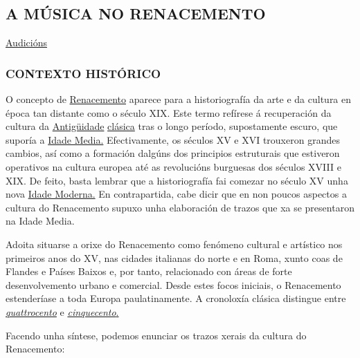 \documentclass[
]{article}
\author{}
\date{}
\begin{document}
\hypertarget{a-muxfasica-no-renacemento}{%
\subsection{A MÚSICA NO RENACEMENTO}\label{a-muxfasica-no-renacemento}}

\href{http://open.spotify.com/user/javierjuradoluque/playlist/6hkvm3DeOXNPNpkdOMWdzc}{Audicións}

\hypertarget{contexto-histuxf3rico}{%
\subsubsection{CONTEXTO HISTÓRICO}\label{contexto-histuxf3rico}}

O concepto de
\href{http://es.wikipedia.org/wiki/Renacimiento}{Renacemento} aparece
para a historiografía da arte e da cultura en época tan distante como o
século XIX. Este termo refírese á recuperación da cultura da
\href{http://es.wikipedia.org/wiki/Antig\%C3\%BCedad_cl\%C3\%A1sica}{Antigüidade}
\href{http://es.wikipedia.org/wiki/Antig\%C3\%BCedad_cl\%C3\%A1sica}{clásica}
tras o longo período, supostamente escuro, que suporía a
\href{http://es.wikipedia.org/wiki/Edad_Media}{Idade Media.}
Efectivamente, os séculos XV e XVI trouxeron grandes cambios, así como a
formación dalgúns dos principios estruturais que estiveron operativos na
cultura europea até as revolucións burguesas dos séculos XVIII e XIX. De
feito, basta lembrar que a historiografía fai comezar no século XV unha
nova \href{http://es.wikipedia.org/wiki/Edad_Moderna}{Idade Moderna.} En
contrapartida, cabe dicir que en non poucos aspectos a cultura do
Renacemento supuxo unha elaboración de trazos que xa se presentaron na
Idade Media.

Adoita situarse a orixe do Renacemento como fenómeno cultural e
artístico nos primeiros anos do XV, nas cidades italianas do norte e en
Roma, xunto coas de Flandes e Países Baixos e, por tanto, relacionado
con áreas de forte desenvolvemento urbano e comercial. Desde estes focos
iniciais, o Renacemento estenderíase a toda Europa paulatinamente. A
cronoloxía clásica distingue entre
\href{http://es.wikipedia.org/wiki/Quattrocento}{\emph{quattrocento}} e
\href{http://es.wikipedia.org/wiki/Cinquecento}{\emph{cinquecento}.}

Facendo unha síntese, podemos enunciar os trazos xerais da cultura do
Renacemento:
\end{document}
